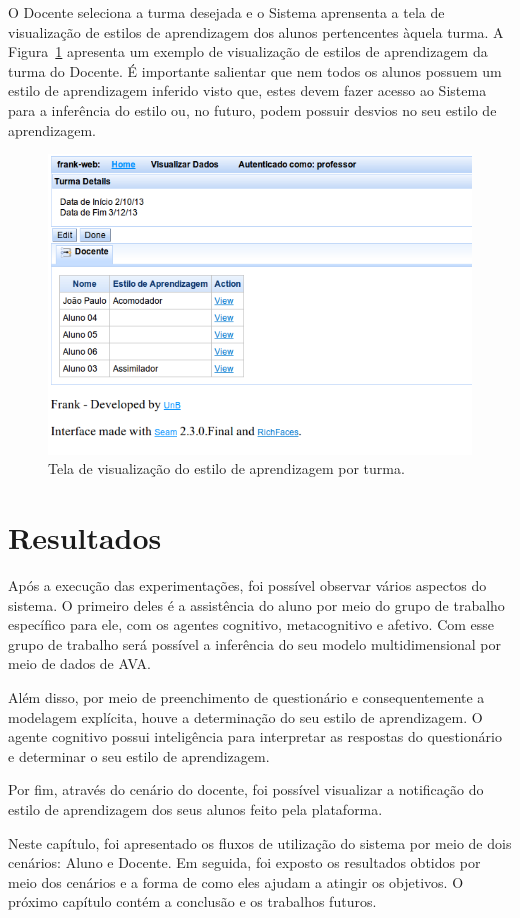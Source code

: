 O Docente seleciona a turma desejada e o Sistema aprensenta a tela de visualização de estilos de aprendizagem dos alunos pertencentes àquela turma. A Figura~\ref{fig:frank-tela-professor-visualizar-turma} apresenta um exemplo de visualização de estilos de aprendizagem da turma do Docente. É importante salientar que nem todos os alunos possuem um estilo de aprendizagem inferido visto que, estes devem fazer acesso ao Sistema para a inferência do estilo ou, no futuro, podem possuir desvios no seu estilo de aprendizagem.

\begin{figure}
	\centering
	\includegraphics[scale=0.6]{images/frank-tela-professor-visualizar-turma.png}
	\caption{Tela de visualização do estilo de aprendizagem por turma.}
	\label{fig:frank-tela-professor-visualizar-turma}
\end{figure}

\section{Resultados}\label{section:resultados}
Após a execução das experimentações, foi possível observar vários aspectos do sistema. O primeiro deles é a assistência do aluno por meio do grupo de trabalho específico para ele, com os agentes cognitivo, metacognitivo e afetivo. Com esse grupo de trabalho será possível a inferência do seu modelo multidimensional por meio de dados de AVA.

Além disso, por meio de preenchimento de questionário e consequentemente a modelagem explícita, houve a determinação do seu estilo de aprendizagem. O agente cognitivo possui inteligência para interpretar as respostas do questionário e determinar o seu estilo de aprendizagem.

Por fim, através do cenário do docente, foi possível visualizar a notificação do estilo de aprendizagem dos seus alunos feito pela plataforma.

Neste capítulo, foi apresentado os fluxos de utilização do sistema por meio de dois cenários: Aluno e Docente. Em seguida, foi exposto os resultados obtidos por meio dos cenários e a forma de como eles ajudam a atingir os objetivos. O próximo capítulo contém a conclusão e os trabalhos futuros.
